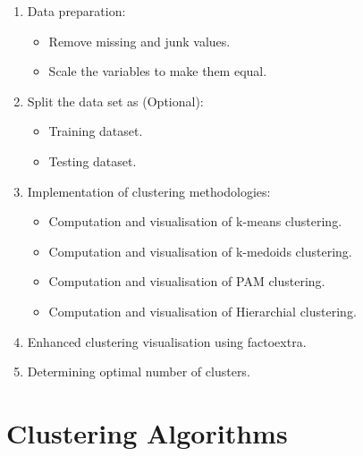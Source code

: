 \documentclass[a4paper,10pt]{article}
\begin{document}
\begin{enumerate}

	\item Data preparation:
	\begin{itemize}
		\item Remove missing and junk values.
		\item Scale the variables to make them equal.
	\end{itemize} 
	
	\item Split the data set as (Optional):
	\begin{itemize}
		\item Training dataset.
		\item Testing dataset.
	\end{itemize}
    \item Implementation of clustering methodologies:
    \begin{itemize}
    	\item Computation  and visualisation of k-means clustering.
    	\item Computation  and visualisation of k-medoids clustering.
    	\item Computation  and visualisation of PAM clustering.
       \item Computation  and visualisation of Hierarchial clustering.	
    \end{itemize}
	\item Enhanced clustering visualisation using factoextra.
	\item Determining optimal number of clusters.
\end{enumerate}	

\section{Clustering Algorithms}
\end{document}
